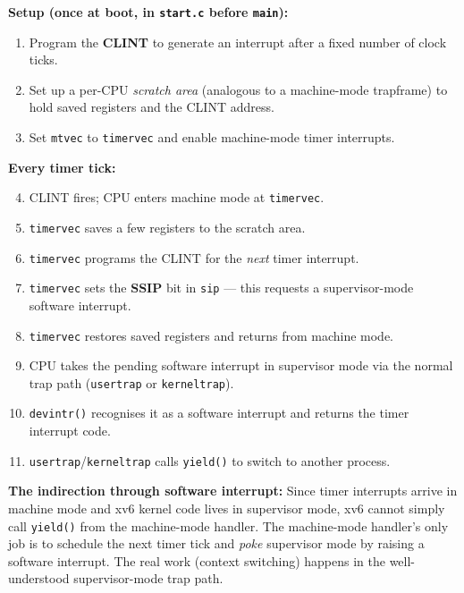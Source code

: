 \documentclass[11pt, a4paper]{article}
\begin{document}
\begin{tcolorbox}[lifecycle, title={Timer Interrupt Lifecycle}]
\textbf{Setup (once at boot, in \lstinline|start.c| before \lstinline|main|):}
\begin{enumerate}[leftmargin=1.8em, itemsep=0.2em]
  \item Program the \textbf{CLINT} to generate an interrupt after a fixed number of clock ticks.
  \item Set up a per-CPU \emph{scratch area} (analogous to a machine-mode trapframe) to hold saved registers and the CLINT address.
  \item Set \lstinline|mtvec| to \lstinline|timervec| and enable machine-mode timer interrupts.
\end{enumerate}

\medskip
\textbf{Every timer tick:}
\begin{enumerate}[leftmargin=1.8em, itemsep=0.2em]
  \setcounter{enumi}{3}
  \item CLINT fires; CPU enters machine mode at \lstinline|timervec|.
  \item \lstinline|timervec| saves a few registers to the scratch area.
  \item \lstinline|timervec| programs the CLINT for the \emph{next} timer interrupt.
  \item \lstinline|timervec| sets the \textbf{SSIP} bit in \lstinline|sip| --- this requests a supervisor-mode software interrupt.
  \item \lstinline|timervec| restores saved registers and returns from machine mode.
  \item CPU takes the pending software interrupt in supervisor mode via the normal trap path (\lstinline|usertrap| or \lstinline|kerneltrap|).
  \item \lstinline|devintr()| recognises it as a software interrupt and returns the timer interrupt code.
  \item \lstinline|usertrap|/\lstinline|kerneltrap| calls \lstinline|yield()| to switch to another process.
\end{enumerate}
\end{tcolorbox}

\begin{tcolorbox}[foundational]
\textbf{The indirection through software interrupt:} Since timer interrupts arrive in machine mode and xv6 kernel code lives in supervisor mode, xv6 cannot simply call \lstinline|yield()| from the machine-mode handler. The machine-mode handler's only job is to schedule the next timer tick and \emph{poke} supervisor mode by raising a software interrupt. The real work (context switching) happens in the well-understood supervisor-mode trap path.
\end{tcolorbox}
\end{document}
